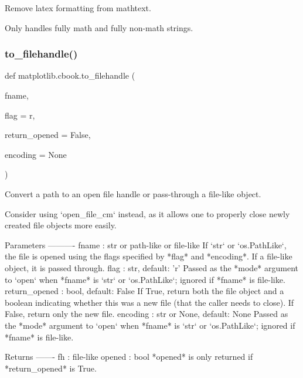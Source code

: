 \begin{DoxyVerb}Remove latex formatting from mathtext.

Only handles fully math and fully non-math strings.
\end{DoxyVerb}
 \mbox{\label{namespacematplotlib_1_1cbook_a1aee71b48934e4a383f1decb05b8e6d7}} 
\subsubsection{\texorpdfstring{to\+\_\+filehandle()}{to\_filehandle()}}
{\footnotesize\ttfamily def matplotlib.\+cbook.\+to\+\_\+filehandle (\begin{DoxyParamCaption}\item[{}]{fname,  }\item[{}]{flag = {\ttfamily \textquotesingle{}r\textquotesingle{}},  }\item[{}]{return\+\_\+opened = {\ttfamily False},  }\item[{}]{encoding = {\ttfamily None} }\end{DoxyParamCaption})}

\begin{DoxyVerb}Convert a path to an open file handle or pass-through a file-like object.

Consider using `open_file_cm` instead, as it allows one to properly close
newly created file objects more easily.

Parameters
----------
fname : str or path-like or file-like
    If `str` or `os.PathLike`, the file is opened using the flags specified
    by *flag* and *encoding*.  If a file-like object, it is passed through.
flag : str, default: 'r'
    Passed as the *mode* argument to `open` when *fname* is `str` or
    `os.PathLike`; ignored if *fname* is file-like.
return_opened : bool, default: False
    If True, return both the file object and a boolean indicating whether
    this was a new file (that the caller needs to close).  If False, return
    only the new file.
encoding : str or None, default: None
    Passed as the *mode* argument to `open` when *fname* is `str` or
    `os.PathLike`; ignored if *fname* is file-like.

Returns
-------
fh : file-like
opened : bool
    *opened* is only returned if *return_opened* is True.
\end{DoxyVerb}
 \mbox{\label{namespacematplotlib_1_1cbook_acb8ae01168625dcd6f0dbcd72fd78176}} 

